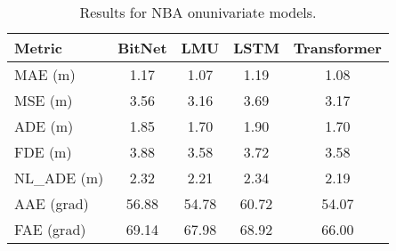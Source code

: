 \begin{table}[H]
\centering
\caption{Results for NBA onunivariate models.}
\label{uni:NBA}
\begin{tabular}{l||c|c|c|c}
Metric & BitNet & LMU & LSTM & Transformer \\
\hline\hline
MAE (m) & 1.17 & 1.07 & 1.19 & 1.08 \\
MSE (m) & 3.56 & 3.16 & 3.69 & 3.17 \\
ADE (m) & 1.85 & 1.70 & 1.90 & 1.70 \\
FDE (m) & 3.88 & 3.58 & 3.72 & 3.58 \\
NL\_ADE (m) & 2.32 & 2.21 & 2.34 & 2.19 \\
AAE (grad) & 56.88 & 54.78 & 60.72 & 54.07 \\
FAE (grad) & 69.14 & 67.98 & 68.92 & 66.00 \\
\end{tabular}
\end{table}
